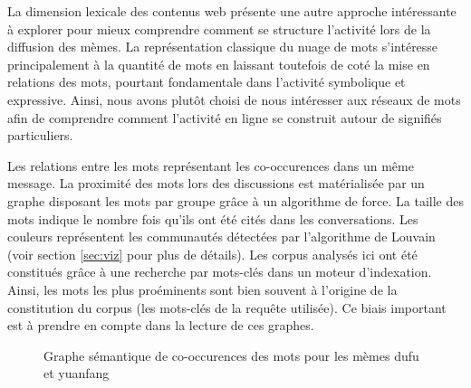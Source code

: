 La dimension lexicale des contenus web présente une autre approche intéressante \`a explorer pour mieux comprendre comment se structure l{\textquoteright}activité lors de la diffusion des mèmes. La représentation classique du nuage de mots s{\textquoteright}intéresse principalement \`a la quantité de mots en laissant toutefois de coté la mise en relations des mots, pourtant fondamentale dans l{\textquoteright}activité symbolique et expressive. Ainsi, nous avons plut\^ot choisi de nous intéresser aux réseaux de mots afin de comprendre comment l{\textquoteright}activité en ligne se construit autour de signifiés particuliers. 

Les relations entre les mots représentant les co-occurences dans un même message. La proximité des mots lors des discussions est matérialisée par un graphe disposant les mots par groupe grâce à un algorithme de force. La taille des mots indique le nombre fois qu'ils ont été cités dans les conversations. Les couleurs représentent les communautés détectées par l'algorithme de Louvain \cite{Blondel2008} (voir section \ref{sec:viz} pour plus de détails). Les corpus analysés ici ont été constitués grâce \`a une recherche par mots-clés dans un moteur d{\textquoteright}indexation. Ainsi, les mots les plus proéminents sont bien souvent \`a l{\textquoteright}origine de la constitution du corpus (les mots-clés de la requête utilisée). Ce biais important est \`a prendre en compte dans la lecture de ces graphes.

\begin{figure}[h!]
    \centering
    
  \caption{
    Graphe sémantique de co-occurences des mots pour les mèmes dufu et yuanfang   
  }
\end{figure}

